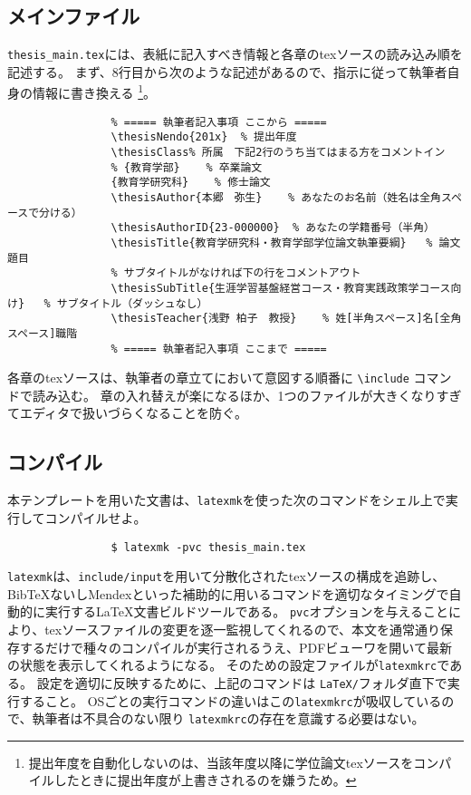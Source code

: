 
		\subsection{メインファイル}
			\label{sub:メインファイル}

			\texttt{thesis\_main.tex}には、表紙に記入すべき情報と各章のtexソースの読み込み順を記述する。
			まず、8行目から次のような記述があるので、指示に従って執筆者自身の情報に書き換える
			\footnote{提出年度を自動化しないのは、当該年度以降に学位論文texソースをコンパイルしたときに提出年度が上書きされるのを嫌うため。}。

			\small
			\begin{verbatim}
				% ===== 執筆者記入事項 ここから =====
				\thesisNendo{201x}	% 提出年度
				\thesisClass% 所属　下記2行のうち当てはまる方をコメントイン
				% {教育学部}	% 卒業論文
				{教育学研究科}	% 修士論文
				\thesisAuthor{本郷　弥生}	% あなたのお名前（姓名は全角スペースで分ける）
				\thesisAuthorID{23-000000}	% あなたの学籍番号（半角）
				\thesisTitle{教育学研究科・教育学部学位論文執筆要綱}	% 論文題目
				% サブタイトルがなければ下の行をコメントアウト
				\thesisSubTitle{生涯学習基盤経営コース・教育実践政策学コース向け}	% サブタイトル（ダッシュなし）
				\thesisTeacher{浅野 柏子　教授}	% 姓[半角スペース]名[全角スペース]職階
				% ===== 執筆者記入事項 ここまで =====
			\end{verbatim}
			\normalsize

			各章のtexソースは、執筆者の章立てにおいて意図する順番に \texttt{\textbackslash include} コマンドで読み込む。
			章の入れ替えが楽になるほか、1つのファイルが大きくなりすぎてエディタで扱いづらくなることを防ぐ。

		\subsection{コンパイル}
			\label{sub:compile}

			本テンプレートを用いた文書は、\texttt{latexmk}を使った次のコマンドをシェル上で実行してコンパイルせよ。

			\begin{verbatim}
				$ latexmk -pvc thesis_main.tex
			\end{verbatim}

			\texttt{latexmk}は、\texttt{include/input}を用いて分散化されたtexソースの構成を追跡し、BibTeXないしMendexといった補助的に用いるコマンドを適切なタイミングで自動的に実行する\LaTeX 文書ビルドツールである。
			\texttt{pvc}オプションを与えることにより、texソースファイルの変更を逐一監視してくれるので、本文を通常通り保存するだけで種々のコンパイルが実行されるうえ、PDFビューワを開いて最新の状態を表示してくれるようになる。
			そのための設定ファイルが\texttt{latexmkrc}である。
			設定を適切に反映するために、上記のコマンドは \texttt{LaTeX/}フォルダ直下で実行すること。
			OSごとの実行コマンドの違いはこの\texttt{latexmkrc}が吸収しているので、執筆者は不具合のない限り \texttt{latexmkrc}の存在を意識する必要はない。


